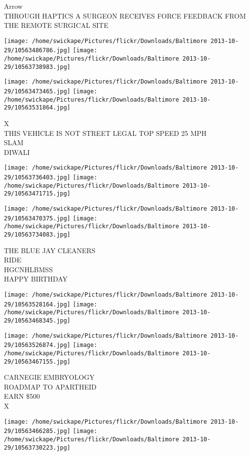 \documentclass[10pt,letterpaper]{article}
\begin{document}
Arrow\\
THROUGH HAPTICS A SURGEON RECEIVES FORCE FEEDBACK FROM THE REMOTE SURGICAL SITE
\pagebreak

\texttt{[image: /home/swickape/Pictures/flickr/Downloads/Baltimore 2013-10-29/10563486786.jpg]}
\texttt{[image: /home/swickape/Pictures/flickr/Downloads/Baltimore 2013-10-29/10563738983.jpg]}

\texttt{[image: /home/swickape/Pictures/flickr/Downloads/Baltimore 2013-10-29/10563473465.jpg]}
\texttt{[image: /home/swickape/Pictures/flickr/Downloads/Baltimore 2013-10-29/10563531864.jpg]}

X\\
THIS VEHICLE IS NOT STREET LEGAL TOP SPEED 25 MPH\\
SLAM\\
DIWALI
\pagebreak

\texttt{[image: /home/swickape/Pictures/flickr/Downloads/Baltimore 2013-10-29/10563736403.jpg]}
\texttt{[image: /home/swickape/Pictures/flickr/Downloads/Baltimore 2013-10-29/10563471715.jpg]}

\texttt{[image: /home/swickape/Pictures/flickr/Downloads/Baltimore 2013-10-29/10563470375.jpg]}
\texttt{[image: /home/swickape/Pictures/flickr/Downloads/Baltimore 2013-10-29/10563734083.jpg]}

THE BLUE JAY CLEANERS\\
RIDE\\
HGCNHLBMSS\\
HAPPY BIRTHDAY
\pagebreak

\texttt{[image: /home/swickape/Pictures/flickr/Downloads/Baltimore 2013-10-29/10563528164.jpg]}
\texttt{[image: /home/swickape/Pictures/flickr/Downloads/Baltimore 2013-10-29/10563468345.jpg]}

\texttt{[image: /home/swickape/Pictures/flickr/Downloads/Baltimore 2013-10-29/10563526874.jpg]}
\texttt{[image: /home/swickape/Pictures/flickr/Downloads/Baltimore 2013-10-29/10563467155.jpg]}

CARNEGIE EMBRYOLOGY\\
ROADMAP TO APARTHEID\\
EARN \$500\\
X
\pagebreak

\texttt{[image: /home/swickape/Pictures/flickr/Downloads/Baltimore 2013-10-29/10563466285.jpg]}
\texttt{[image: /home/swickape/Pictures/flickr/Downloads/Baltimore 2013-10-29/10563730223.jpg]}
\end{document}
